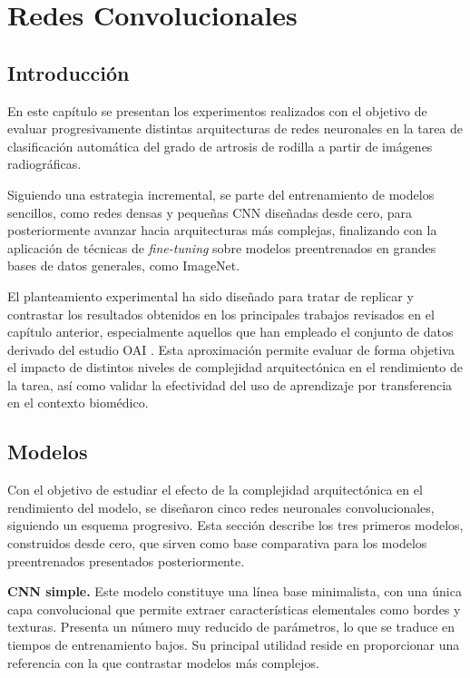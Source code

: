 \documentclass[11pt,spanish,listoffigures,listoftables]{tfgetsinf}
\begin{document}
\chapter{Redes Convolucionales}
\label{chap:experiments}


\section{Introducción} 
En este capítulo se presentan los experimentos realizados con el objetivo de evaluar progresivamente distintas 
arquitecturas de redes neuronales en la tarea de clasificación automática del grado de artrosis de rodilla a 
partir de imágenes radiográficas.

Siguiendo una estrategia incremental, se parte del entrenamiento de modelos sencillos, como redes densas y 
pequeñas CNN diseñadas desde cero, para posteriormente avanzar hacia arquitecturas más complejas, finalizando 
con la aplicación de técnicas de \textit{fine-tuning} sobre modelos preentrenados en grandes bases de datos 
generales, como ImageNet.

El planteamiento experimental ha sido diseñado para tratar de replicar y contrastar los resultados obtenidos 
en los principales trabajos revisados en el capítulo anterior, especialmente aquellos que han empleado el 
conjunto de datos derivado del estudio OAI \cite{chen2018knee}. Esta aproximación permite evaluar de forma 
objetiva el impacto de distintos niveles de complejidad arquitectónica en el rendimiento de la tarea, así 
como validar la efectividad del uso de aprendizaje por transferencia en el contexto biomédico.

\section{Modelos}

Con el objetivo de estudiar el efecto de la complejidad arquitectónica en el rendimiento del modelo, se diseñaron cinco 
redes neuronales convolucionales, siguiendo un esquema progresivo. Esta sección describe los tres primeros modelos, 
construidos desde cero, que sirven como base comparativa para los modelos preentrenados presentados posteriormente.

\textbf{CNN simple.}  
Este modelo constituye una línea base minimalista, con una única capa convolucional que permite extraer características 
elementales como bordes y texturas. Presenta un número muy reducido de parámetros, lo que se traduce en tiempos de entrenamiento 
bajos. Su principal utilidad reside en proporcionar una referencia con la que contrastar modelos más complejos.
\end{document}
